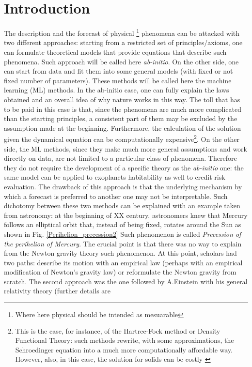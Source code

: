 \documentclass[12pt,%
               a4paper,%
               oneside,openany,%
               titlepage,%
               headinclude,footinclude,%
               BCOR5mm,%
               cleardoublepage=empty,%
               tablecaptionabove,%
               floatperchapter,
               ]{scrreprt}                 %
\begin{document}
\tableofcontents %

\newpage %



\newpage

\chapter{Introduction} The description and the forecast of physical \footnote{Where here physical should be intended as mesuarable} phenomena can be attacked with two different approaches: starting from a restricted set of principles/axioms, one can formulate theoretical models that provide equations that describe such phenomena. Such approach will be called here \textit{ab-initio}. On the other side, one can start from data and fit them into some general models (with fixed or not fixed number of parameters). These methods will be called here the machine learning (ML) methods. In the ab-initio case, one can fully explain the laws obtained and an overall idea of why nature works in this way. The toll that has to be paid in this case is that, since the phenomena are much more complicated than the starting principles, a consistent part of them may be excluded by the assumption made at the beginning. Furthermore, the calculation of the solution given the dynamical equation can be computationally expensive\footnote{This is the case, for instance, of the Hartree-Fock method or Density Functional Theory: such methods rewrite, with some approximations, the Schroedinger equation into a much more computationally affordable way. However, also, in this case, the solution for solids can be costly \cite{martin_2004}}. On the other side, the ML methods, since they make much more general assumptions and work directly on data, are not limited to a particular class of phenomena. Therefore they do not require the development of a specific theory as the \textit{ab-initio} one: the same model can be applied to exoplanets habitability as well to credit risk evaluation. The drawback of this approach is that the underlying mechanism by which a forecast is preferred to another one may not be interpretable. Such dichotomy between these two methods can be explained with an example taken from astronomy: at the beginning of XX century, astronomers knew that Mercury follows an elliptical orbit that, instead of being fixed, rotates around the Sun as shown in Fig. \ref{Perihelion_precession2} Such phenomenon is called \textit{Precession of the perihelion of Mercury}. The crucial point is that there was no way to explain from the Newton gravity theory such phenomenon. At this point, scholars had two paths: describe its motion with an empirical law (perhaps with an empirical modification of Newton's gravity law) or reformulate the Newton gravity from scratch. The second approach was the one followed by A.Einstein with his general relativity theory (further details are 
\end{document}
